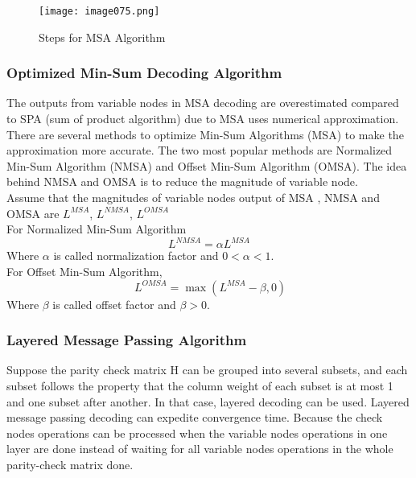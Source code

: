 \begin{figure}[ht]
    \centering
    \texttt{[image: image075.png]}
    \caption{Steps for MSA Algorithm}
    \label{fig:MSA Algorithm}
\end{figure}

\subsubsection{Optimized Min-Sum Decoding Algorithm}
The outputs from variable nodes in MSA decoding are overestimated compared to SPA (sum of product algorithm) due to MSA uses  numerical approximation. There are several methods to optimize Min-Sum Algorithms (MSA) to make the approximation more accurate. The two most popular methods are Normalized Min-Sum Algorithm (NMSA) and Offset Min-Sum Algorithm (OMSA). The idea behind NMSA and OMSA is to reduce the magnitude of variable node.\\
Assume that the magnitudes of variable nodes output of MSA , NMSA and OMSA are $L^{MSA}$, $L^{NMSA}$, $L^{OMSA}$ \\
For Normalized Min-Sum Algorithm
\[ L^{NMSA}=\alpha L^{MSA} \]
Where $\alpha$ is called normalization factor and $0 < \alpha < 1$. \\
For Offset Min-Sum Algorithm,
\[ \ L^{OMSA}=\max\left(L^{MSA}-\beta,0\right) \]
Where $\beta$ is called offset factor and $\beta > 0$.

\subsubsection{Layered Message Passing Algorithm}
Suppose the parity check matrix H can be grouped into several subsets, and each subset follows the property that the column weight of each subset is at most 1 and one subset after another. In that case, layered decoding can be used. Layered message passing decoding can expedite convergence time. Because the check nodes operations can be processed when the variable nodes operations in one layer are done instead of waiting for all variable nodes operations in the whole parity-check matrix done.\\

